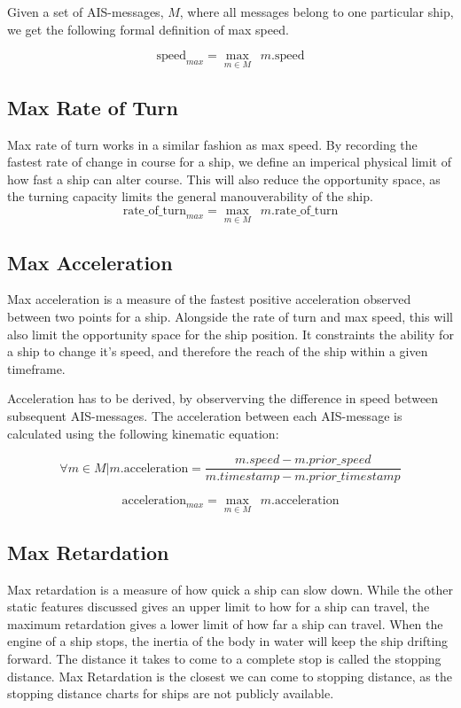 Given a set of AIS-messages, $M$, where all messages belong to one particular ship, we get the following formal definition of max speed.

$$
	\mathrm{speed}_{max} = \max_{m \in M}\;\:{m.\mathrm{speed}}
$$

\subsection{Max Rate of Turn}
Max rate of turn works in a similar fashion as max speed. By recording the fastest rate of change in course for a ship, we define an imperical physical limit of how fast a ship can alter course. This will also reduce the opportunity space, as the turning capacity limits the general manouverability of the ship.
$$
	\mathrm{rate\_of\_turn}_{max} = \max_{m \in M}\;\:{m.\mathrm{rate\_of\_turn}}
$$

\subsection{Max Acceleration}
Max acceleration is a measure of the fastest positive acceleration observed between two points for a ship. Alongside the rate of turn and max speed, this will also limit the opportunity space for the ship position. It constraints the ability for a ship to change it's speed, and therefore the reach of the ship within a given timeframe.

Acceleration has to be derived, by observerving the difference in speed between subsequent AIS-messages. The acceleration between each AIS-message is calculated using the following kinematic equation:

$$
	\forall m \in M | m.\mathrm{acceleration} = \dfrac{m.speed - m.prior\_speed }{m.timestamp - m.prior\_timestamp}
$$

$$
	\mathrm{acceleration}_{max} = \max_{m \in M}\;\:{m.\mathrm{acceleration}}
$$


\subsection{Max Retardation}
Max retardation is a measure of how quick a ship can slow down. While the other static features discussed gives an upper limit to how for a ship can travel, the maximum retardation gives a lower limit of how far a ship can travel. When the engine of a ship stops, the inertia of the body in water will keep the ship drifting forward. The distance it takes to come to a complete stop is called the stopping distance. Max Retardation is the closest we can come to stopping distance, as the stopping distance charts for ships are not publicly available.


